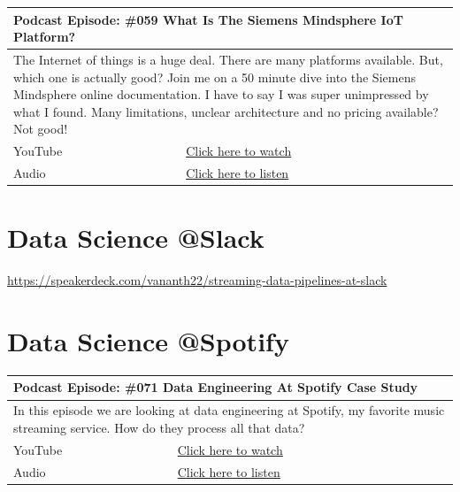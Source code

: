 \documentclass[12pt, numbers=noenddot]{scrreprt} %
\begin{document}
\begin{table}[h]
\begin{tabular}{ll}
\hline
\multicolumn{2}{l}{\textbf{Podcast Episode:} \#059 What Is The Siemens Mindsphere IoT Platform?} \\ \hline
\multicolumn{2}{p{15cm}}{The Internet of things is a huge deal. There are many platforms available. But, which one is actually good? Join me on a 50 minute dive into the Siemens Mindsphere online documentation.
 I have to say I was super unimpressed by what I found.
Many limitations, unclear architecture and no pricing available?
Not good!}         \\ \hline
\multicolumn{1}{l|}{YouTube}   & \href{https://youtu.be/HEd5Tsuy5HE}{Click here to watch}   \\
\multicolumn{1}{l|}{Audio}     & \href{https://anchor.fm/andreaskayy/episodes/059-A-Look-Into-The-Siemens-Mindsphere-IoT-Platform---059-e45ihn}{Click here to listen}   \\ \hline
\end{tabular}
\end{table}


\section{Data Science @Slack}
\url{https://speakerdeck.com/vananth22/streaming-data-pipelines-at-slack}

\section{Data Science @Spotify}

\begin{table}[h]
\begin{tabular}{ll}
\hline
\multicolumn{2}{l}{\textbf{Podcast Episode:} \#071 Data Engineering At Spotify Case Study} \\ \hline
\multicolumn{2}{p{15cm}}{In this episode we are looking at data engineering at Spotify, my favorite music streaming service. How do they process all that data?}         \\ \hline
\multicolumn{1}{l|}{YouTube}   & \href{https://youtu.be/0WJZ5wtQRWI}{Click here to watch}   \\
\multicolumn{1}{l|}{Audio}     & \href{https://anchor.fm/andreaskayy/episodes/071-Data-Engineering-At-Spotify-Case-Study-e45iq1}{Click here to listen}   \\ \hline
\end{tabular}
 \label{tbl:spotifycasestudy}
\end{table}
\end{document}

